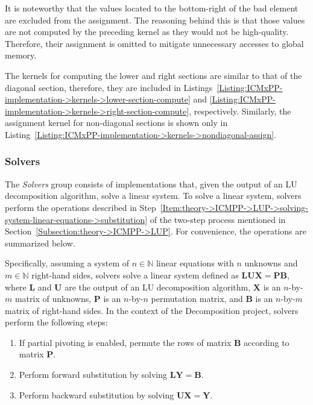 It is noteworthy that the values located to the bottom-right of the bad element are excluded from the assignment.
The reasoning behind this is that those values are not computed by the preceding kernel as they would not be high-quality.
Therefore, their assignment is omitted to mitigate unnecessary accesses to global memory.

The kernels for computing the lower and right sections are similar to that of the diagonal section, therefore, they are included in Listings~\ref{Listing:ICMxPP-implementation->kernels->lower-section-compute} and \ref{Listing:ICMxPP-implementation->kernels->right-section-compute}, respectively.
Similarly, the assignment kernel for non-diagonal sections is shown only in Listing~\ref{Listing:ICMxPP-implementation->kernels->nondiagonal-assign}.

\subsubsection{Solvers}\label{Subsection:implementation->decomposition-project->implemented-solutions->solvers}
The \textit{Solvers} group consists of implementations that, given the output of an LU decomposition algorithm, solve a linear system.
To solve a linear system, solvers perform the operations described in Step~\ref{Item:theory->ICMPP->LUP->solving-system-linear-equations->substitution} of the two-step process mentioned in Section~\ref{Subsection:theory->ICMPP->LUP}.
For convenience, the operations are summarized below.

Specifically, assuming a system of $n \in \mathbb{N}$ linear equations with $n$ unknowns and $m \in \mathbb{N}$ right-hand sides, solvers solve a linear system defined as $\mathbf{LUX} = \mathbf{PB}$, where $\mathbf{L}$ and $\mathbf{U}$ are the output of an LU decomposition algorithm, $\mathbf{X}$ is an $n$-by-$m$ matrix of unknowns, $\mathbf{P}$ is an $n$-by-$n$ permutation matrix, and $\mathbf{B}$ is an $n$-by-$m$ matrix of right-hand sides.
In the context of the Decomposition project, solvers perform the following steps:

\begin{enumerate}
	\item If partial pivoting is enabled, permute the rows of matrix $\mathbf{B}$ according to matrix $\mathbf{P}$.
	\item \label{Item:implementation->decomposition-project->implemented-solutions->solvers->forward-substitution}
		Perform forward substitution by solving $\mathbf{LY} = \mathbf{B}$.
	\item \label{Item:implementation->decomposition-project->implemented-solutions->solvers->backward-substitution}
		Perform backward substitution by solving $\mathbf{UX} = \mathbf{Y}$.
\end{enumerate}

